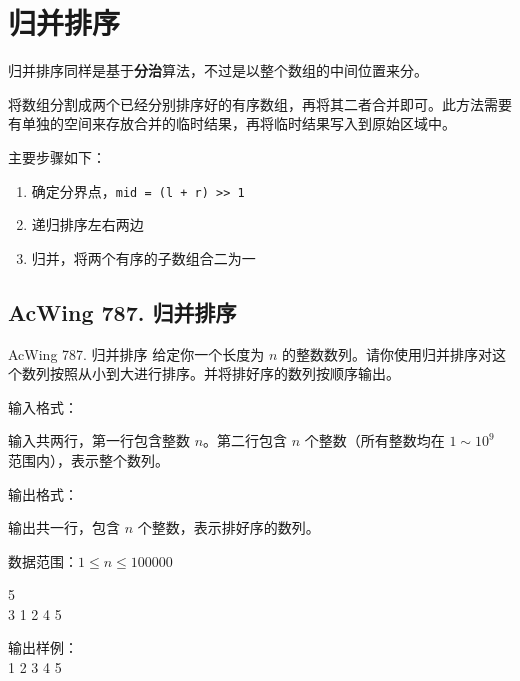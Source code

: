 \section{归并排序}
归并排序同样是基于\textbf{分治}算法，不过是以整个数组的中间位置来分。

将数组分割成两个已经分别排序好的有序数组，再将其二者合并即可。此方法需要有单独的空间来存放合并的临时结果，再将临时结果写入到原始区域中。

主要步骤如下：
\begin{enumerate}
    \item 确定分界点，\lstinline{mid = (l + r) >> 1}
    \item 递归排序左右两边
    \item 归并，将两个有序的子数组合二为一
\end{enumerate}

\subsection{AcWing 787. 归并排序}
\begin{titledbox}{AcWing 787. 归并排序}
    给定你一个长度为 $n$ 的整数数列。请你使用归并排序对这个数列按照从小到大进行排序。并将排好序的数列按顺序输出。

    输入格式：

    输入共两行，第一行包含整数 $n$。第二行包含 $n$ 个整数（所有整数均在 $1 \sim 10^9$ 范围内），表示整个数列。

    输出格式：

    输出共一行，包含 $n$ 个整数，表示排好序的数列。

    数据范围：$1 \le n \le 100000$

    \begin{inputblock}
        5 \\
        3 1 2 4 5
    \end{inputblock}%
    \begin{minipage}[t]{.5\textwidth}
        输出样例：\\
        1 2 3 4 5
    \end{minipage}
\end{titledbox}

